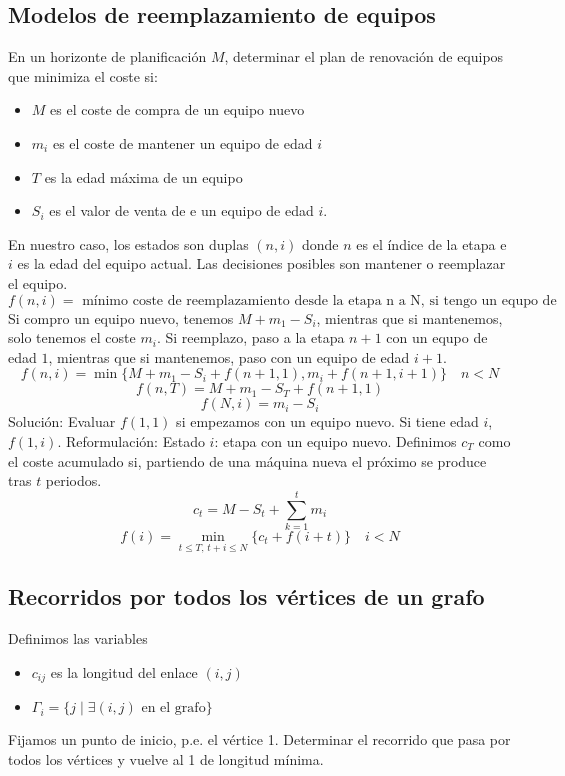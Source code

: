 \documentclass[MIOP.tex]{subfiles}
\begin{document}
\subsection{Modelos de reemplazamiento de equipos}
En un horizonte de planificación $M$, determinar el plan de renovación de equipos que minimiza el coste si:
\begin{itemize}
\item $M$ es el coste de compra de un equipo nuevo
\item $m_i$ es el coste de mantener un equipo de edad $i$
\item $T$ es la edad máxima de un equipo
\item $S_i$ es el valor de venta de e un equipo de edad $i$.
\end{itemize}
En nuestro caso, los estados son duplas $(n,i)$ donde $n$ es el índice de la etapa e $i$ es la edad del equipo actual. Las decisiones posibles son mantener o reemplazar el equipo. 
$$
f(n,i) = \text{ mínimo coste de reemplazamiento desde la etapa n a N, si tengo un equpo de edad i}$$
Si compro un equipo nuevo, tenemos $M+m_1-S_i$, mientras que si mantenemos, solo tenemos el coste $m_i$. Si reemplazo, paso a la etapa $n+1$ con un equpo de edad $1$, mientras que si mantenemos, paso con un equipo de edad $i+1$.
$$
f(n,i)=\min\{M+m_1-S_i+f(n+1,1),m_i+f(n+1,i+1)\}\quad n<N
$$
$$
f(n,T) = M+m_1-S_T + f(n+1,1)
$$
$$f(N,i) = m_i-S_i
$$
Solución: Evaluar $f(1,1)$ si empezamos con un equipo nuevo. Si tiene edad $i$, $f(1,i)$. Reformulación: Estado $i$: etapa con un equipo nuevo. Definimos $c_T$ como el coste acumulado si, partiendo de una máquina nueva el próximo se produce tras $t$ periodos. 
$$
c_t = M - S_t + \sum_{k=1}^t m_i
$$
$$
f(i) =\min_{t\leq T,\,t+i\leq N} \{c_t+f(i+t)\}\quad i<N
$$
\subsection{Recorridos por todos los vértices de un grafo}
Definimos las variables
\begin{itemize}
\item $c_{ij}$ es la longitud del enlace $(i,j)$
\item $\Gamma_i = \{j \mid \exists (i,j) \text{ en el grafo}\}$
\end{itemize}
Fijamos un punto de inicio, p.e. el vértice 1. Determinar el recorrido que pasa por todos los vértices y vuelve al 1 de longitud mínima.
\end{document}
